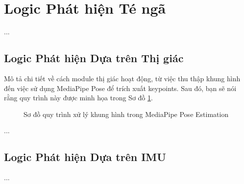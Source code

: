 \section{Logic Phát hiện Té ngã}
\label{sec:detection_logic}

...

\subsection{Logic Phát hiện Dựa trên Thị giác}
\label{subsec:vision_logic}

Mô tả chi tiết về cách module thị giác hoạt động, từ việc thu thập khung hình đến việc sử dụng MediaPipe Pose để trích xuất keypoints. Sau đó, bạn sẽ nói rằng quy trình này được minh họa trong Sơ đồ \ref{fig:processing_flow}.

\begin{figure}[h!] %
    \centering
    \begin{tikzpicture}
    \end{tikzpicture}
    \caption{Sơ đồ quy trình xử lý khung hình trong MediaPipe Pose Estimation}
    \label{fig:processing_flow}
\end{figure}

...

\subsection{Logic Phát hiện Dựa trên IMU}
...
